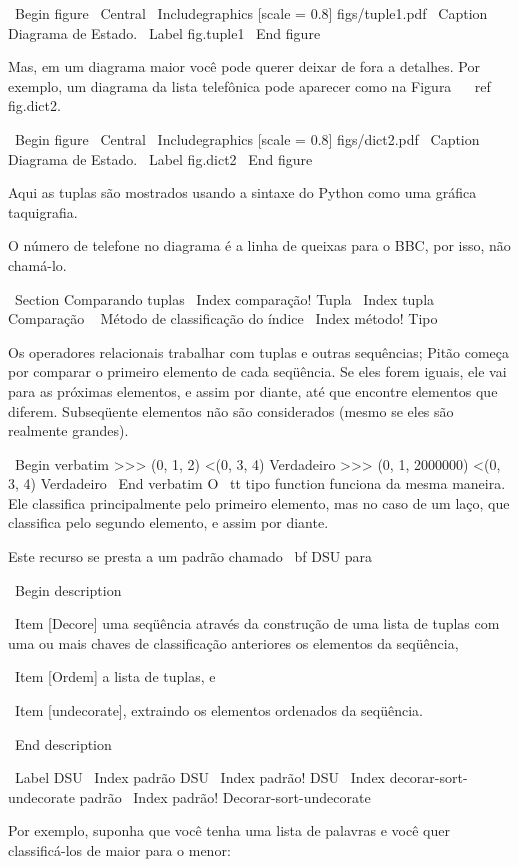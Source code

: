\documentclass[10pt]{book}
\begin{document}
\begin {itemize}
{{{{{{{{{\ Begin {figure}
\ Central
{\ Includegraphics [scale = 0.8] {figs/tuple1.pdf}}
\ Caption {Diagrama de Estado.}
\ Label {} fig.tuple1
\ End {figure}

Mas, em um diagrama maior você pode querer deixar de fora a
detalhes. Por exemplo, um diagrama da lista telefônica pode
aparecer como na Figura ~ \ ref {} fig.dict2.

\ Begin {figure}
\ Central
{\ Includegraphics [scale = 0.8] {figs/dict2.pdf}}
\ Caption {Diagrama de Estado.}
\ Label {} fig.dict2
\ End {figure}

Aqui as tuplas são mostrados usando a sintaxe do Python como uma gráfica
taquigrafia.

O número de telefone no diagrama é a linha de queixas para o
BBC, por isso, não chamá-lo.



\ Section {} Comparando tuplas
\ Index {comparação! Tupla}
\ Index {tupla Comparação}
\ {} Método de classificação do índice
\ Index {método! Tipo}

Os operadores relacionais trabalhar com tuplas e outras sequências;
Pitão começa por comparar o primeiro elemento de cada
seqüência. Se eles forem iguais, ele vai para as próximas elementos,
e assim por diante, até que encontre elementos que diferem. Subseqüente
elementos não são considerados (mesmo se eles são realmente grandes).

\ Begin {verbatim}
>>> (0, 1, 2) <(0, 3, 4)
Verdadeiro
>>> (0, 1, 2000000) <(0, 3, 4)
Verdadeiro
\ End {verbatim}
%
O {\ tt tipo} function funciona da mesma maneira. Ele classifica
principalmente pelo primeiro elemento, mas no caso de um laço, que classifica
pelo segundo elemento, e assim por diante.  

Este recurso se presta a um padrão chamado {\ bf DSU} para 

\ Begin {description}

\ Item [Decore] uma seqüência através da construção de uma lista de tuplas
com uma ou mais chaves de classificação anteriores os elementos da seqüência,

\ Item [Ordem] a lista de tuplas, e

\ Item [undecorate], extraindo os elementos ordenados da seqüência.

\ End {description}

\ Label {} DSU
\ Index {padrão DSU}
\ Index {padrão! DSU}
\ Index {decorar-sort-undecorate padrão}
\ Index {padrão! Decorar-sort-undecorate}

Por exemplo, suponha que você tenha uma lista de palavras e você quer
classificá-los de maior para o menor:

}}}}}}}}}
\end{itemize}
\end{document}
